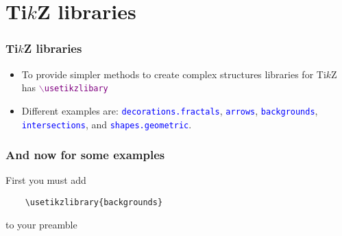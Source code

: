 %
%
\section{
  Ti$k$Z libraries
}
%
%
\begin{frame}
  \frametitle{
    Ti$k$Z libraries
  }
  \begin{itemize}
  \item
    To provide simpler methods to create complex structures
    libraries for Ti$k$Z has \textcolor{purple}{\tt $\backslash$usetikzlibary}
  \item
    Different examples are: \textcolor{blue}{ \tt decorations.fractals},  \textcolor{blue}{ \tt arrows}, \textcolor{blue}{ \tt backgrounds}, \textcolor{blue}{ \tt intersections}, and \textcolor{blue}{ \tt shapes.geometric}.
  \end{itemize}
\end{frame}

%
%
\begin{frame}[fragile]
  \frametitle{
    And now for some examples
  }

  First you must add

  \begin{lstlisting}
    \usetikzlibrary{backgrounds}
  \end{lstlisting}
  
  to your preamble

  \begin{center}
    
  \end{center}

  

\end{frame}

